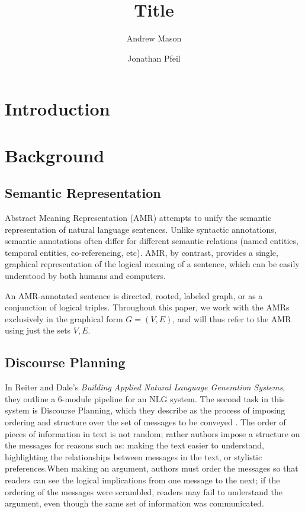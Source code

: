 \documentclass[12pt]{article}
\title{Title}
\author{Andrew Mason \and Jonathan Pfeil}
\begin{document}
\maketitle
\tableofcontents
\pagebreak

\section{Introduction}
\section{Background}
\subsection{Semantic Representation}

Abstract Meaning Representation (AMR)\cite{amr_sembank} attempts to unify the
semantic representation of natural language sentences. Unlike syntactic
annotations, semantic annotations often differ for different semantic relations
(named entities, temporal entities, co-referencing, etc). AMR, by contrast,
provides a single, graphical representation of the logical meaning of a
sentence, which can be easily understood by both humans and computers.

An AMR-annotated sentence is directed, rooted, labeled graph, or as a
conjunction of logical triples. Throughout this paper, we work with the AMRs
exclusively in the graphical form $G=(V,E)$, and will thus refer to the AMR
using just the sets $V,E$.

\subsection{Discourse Planning}

In Reiter and Dale's {\em Building Applied Natural Language Generation Systems}, they outline a 6-module pipeline for an NLG system. The second task in this system is Discourse Planning, which they describe as the process of imposing ordering and structure over the set of messages to be conveyed \cite{applied_nlg}. The order of pieces of information in text is not random; rather authors impose a structure on the messages for reasons such as: making the text easier to understand, highlighting the relationships between messages in the text, or stylistic preferences.When making an argument, authors must order the messages so that readers can see the logical implications from one message to the next; if the ordering of the messages were scrambled, readers may fail to understand the argument, even though the same set of information was communicated.
\end{document}
